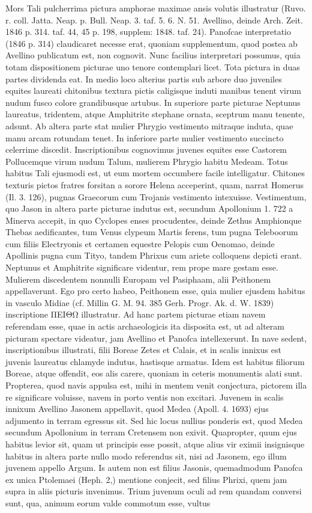 \documentclass[a4paper, 11pt, oneside, polutonikogreek, german]{article}
\begin{document}
Mors Tali pulcherrima pictura amphorae maximae ansis volutis illustratur (Ruvo. r. coll. Jatta. Neap. p. Bull. Neap. 3. taf. 5. 6. N. 51. Avellino, deinde Arch. Zeit. 1846 p. 314. taf. 44, 45 p. 198, supplem: 1848. taf. 24). Panofcae interpretatio (1846 p. 314) claudicaret necesse erat, quoniam supplementum, quod postea ab Avellino publicatum est, non cognovit. Nunc facilius interpretari possumus, quia totam dispositionem picturae uno tenore contemplari licet. Tota pictura in duas partes dividenda eat. In medio loco alterius partis sub arbore duo juveniles equites laureati chitonibus textura pictis caligisque induti manibus tenent virum nudum fusco colore grandibusque artubus. In superiore parte picturae Neptunus laureatus, tridentem, atque Amphitrite stephane ornata, sceptrum manu tenente, adsunt. Ab altera parte stat mulier Phrygio vestimento mitraque induta, quae manu arcam rotundam tenet. In inferiore parte mulier vestimento succincto celerrime discedit. Inscriptionibus cognovimus juvenes equites esse Castorem Pollucemque virum nudum Talum, mulierem Phrygio habitu Medeam. Totus habitus Tali ejusmodi est, ut eum mortem occumbere facile intelligatur. Chitones texturis pictos fratres forsitan a sorore Helena acceperint, quam, narrat Homerus (Il. 3. 126), pugnas Graecorum cum Trojanis vestimento intexuisse. Vestimentum, quo Jason in altera parte picturae indutus est, secundum Apollonium 1. 722 a Minerva accepit, in quo Cyclopes enses procudentes, deinde Zethus Amphionque Thebas aedificantes, tum Venus clypeum Martis ferens, tum pugna Teleboorum cum filiis Electryonis et certamen equestre Pelopis cum Oenomao, deinde Apollinis pugna cum Tityo, tandem Phrixus cum ariete colloquens depicti erant. Neptunus et Amphitrite significare videntur, rem prope mare gestam esse. Mulierem discedentem nonnulli Europam vel Pasiphaam, alii Peithonem appellaverunt. Ego pro certo habeo, Peithonem esse, quia mulier ejusdem habitus in vasculo Midiae (cf. Millin G. M. 94. 385 Gerh. Progr. Ak. d. W. 1839) inscriptione ΠΕΙΘΩ illustratur. Ad hanc partem picturae etiam navem referendam esse, quae in actis archaeologicis ita disposita est, ut ad alteram picturam spectare videatur, jam Avellino et Panofca intellexerunt. In nave sedent, inscriptionibus illustrati, filii Boreae Zetes et Calais, et in scalis innixus est juvenis laureatus chlamyde indutus, hastisque armatus. Idem est habitus filiorum Boreae, atque offendit, eos alis carere, quoniam in ceteris monumentis alati sunt. Propterea, quod navis appulsa est, mihi in mentem venit conjectura, pictorem illa re significare voluisse, navem in porto ventis non excitari. Juvenem in scalis innixum Avellino Jasonem appellavit, quod Medea (Apoll. 4. 1693) ejus adjumento in terram egressus sit. Sed hic locus nullius ponderis est, quod Medea secundum Apollonium in terram Cretensem non exivit. Quapropter, quum ejus habitus levior sit, quam ut principis esse possit, atque alius vir eximii insignisque habitus in altera parte nullo modo referendus sit, nisi ad Jasonem, ego illum juvenem appello Argum. Is autem non est filius Jasonis, quemadmodum Panofca ex unica Ptolemaei (Heph. 2,) mentione conjecit, sed filius Phrixi, quem jam supra in aliis picturis invenimus. Trium juvenum oculi ad rem quandam conversi sunt, qua, animum eorum valde commotum esse, vultus 
\end{document}
